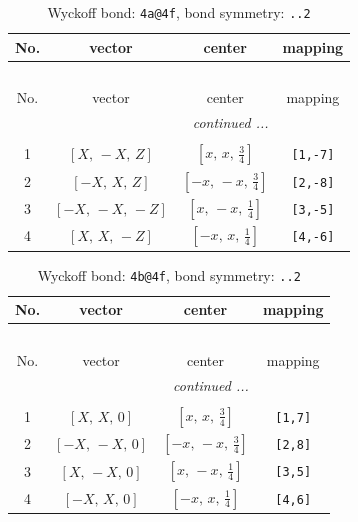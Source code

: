 \documentclass[fleqn,8pt]{jsarticle}
\begin{document}
\begin{longtable}{cccc}
\caption{Wyckoff bond: {\tt 4a@4f}, bond symmetry: {\tt ..2}}
 \\
 \hline \hline
No. & vector & center & mapping \\ \hline \endfirsthead

\multicolumn{3}{l}{\tablename\ \thetable{}} \\
 \hline \hline
No. & vector & center & mapping \\ \hline \endhead

 \hline \hline
\multicolumn{3}{r}{\footnotesize\it continued ...} \\ \endfoot

 \hline \hline
\multicolumn{3}{r}{} \\ \endlastfoot

1 & $\left[ X,\, - X,\, Z \right]$ & $\left[ x,\, x,\, \frac{3}{4} \right]$ & {\tt [1,-7]} \\ \hline
2 & $\left[ - X,\, X,\, Z \right]$ & $\left[ - x,\, - x,\, \frac{3}{4} \right]$ & {\tt [2,-8]} \\ \hline
3 & $\left[ - X,\, - X,\, - Z \right]$ & $\left[ x,\, - x,\, \frac{1}{4} \right]$ & {\tt [3,-5]} \\ \hline
4 & $\left[ X,\, X,\, - Z \right]$ & $\left[ - x,\, x,\, \frac{1}{4} \right]$ & {\tt [4,-6]} \\
\end{longtable}
\renewcommand{\arraystretch}{1.2}
\begin{longtable}{cccc}
\caption{Wyckoff bond: {\tt 4b@4f}, bond symmetry: {\tt ..2}}
 \\
 \hline \hline
No. & vector & center & mapping \\ \hline \endfirsthead

\multicolumn{3}{l}{\tablename\ \thetable{}} \\
 \hline \hline
No. & vector & center & mapping \\ \hline \endhead

 \hline \hline
\multicolumn{3}{r}{\footnotesize\it continued ...} \\ \endfoot

 \hline \hline
\multicolumn{3}{r}{} \\ \endlastfoot

1 & $\left[ X,\, X,\, 0 \right]$ & $\left[ x,\, x,\, \frac{3}{4} \right]$ & {\tt [1,7]} \\ \hline
2 & $\left[ - X,\, - X,\, 0 \right]$ & $\left[ - x,\, - x,\, \frac{3}{4} \right]$ & {\tt [2,8]} \\ \hline
3 & $\left[ X,\, - X,\, 0 \right]$ & $\left[ x,\, - x,\, \frac{1}{4} \right]$ & {\tt [3,5]} \\ \hline
4 & $\left[ - X,\, X,\, 0 \right]$ & $\left[ - x,\, x,\, \frac{1}{4} \right]$ & {\tt [4,6]} \\
\end{longtable}
\end{document}
